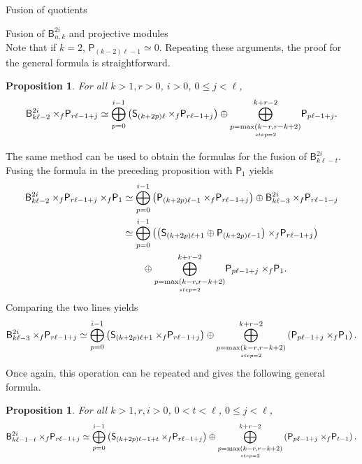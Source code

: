 \documentclass[reqno]{amsart}
\newtheorem{Prop}[Thm]{Proposition}
\newcommand{\ds}[1]{\mathsf S_{#1}}
\newcommand{\dP}[1]{\mathsf P_{#1}}
\newcommand{\xf}{\times\hspace{-0.27em}_f}
\newcommand{\B}[2]{\mathsf{B}^{#1}_{#2}}
\newcommand{\lc}{\ell}
\begin{document}
\begin{section}{Fusion of quotients}
\begin{subsection}{Fusion of $\B{2i}{n,k}$ and projective modules}
\begin{equation*}
\end{equation*}
Note that if $k=2$, $\dP{(k-2)\lc-1}\simeq 0$. Repeating these arguments, the proof for the general formula is straightforward.
\begin{Prop}\label{prop:fusionBvsP}
For all $k>1,r>0$, $i>0$, $0\leq j<\lc$,
\begin{equation}
	\B{2i}{k\lc-2} \xf \dP{r\lc -1 +j} \simeq \overset{i-1}{\underset{p = 0}{\bigoplus}}\left(\ds{(k+2p)\lc} \xf \dP{r\lc-1+j}\right) \oplus \overset{k+r-2}{\underset{\underset{step=2}{p = \max\left( k-r,r-k+2\right)}}{\bigoplus}} \dP{p\lc-1+j}.
\end{equation}
\end{Prop}
The same method can be used to obtain the formulas for the fusion of $\B{2i}{k\lc-t}$. Fusing the formula in the preceding proposition with $\dP{1}$ yields
\begin{align}
\B{2i}{k\lc-2} \xf \dP{r\lc -1 +j} \xf \dP{1}  & \simeq \overset{i-1}{\underset{p = 0}{\bigoplus}}\left(\dP{(k+2p)\lc-1} \xf \dP{r \lc-1 +j}\right) \oplus \B{2i}{k\lc-3} \xf \dP{r \lc -1 -j} \\
& \simeq \overset{i-1}{\underset{p = 0}{\bigoplus}}\left(\left(\ds{(k+2p)\lc+1} \oplus \dP{(k+2p)\lc-1}\right) \xf \dP{r\lc-1+j}\right)\\
& \qquad \oplus \overset{k+r-2}{\underset{\underset{step=2}{p = \max\left( k-r,r-k+2\right)}}{\bigoplus}} \dP{p\lc-1+j}\xf \dP{1}.
\end{align}
Comparing the two lines yields
\begin{equation}
	\B{2i}{k\lc-3} \xf \dP{r\lc -1 +j} \simeq \overset{i-1}{\underset{p = 0}{\bigoplus}}\left(\ds{(k+2p)\lc+1} \xf \dP{r\lc-1+j}\right) \oplus \overset{k+r-2}{\underset{\underset{step=2}{p = \max\left( k-r,r-k+2\right)}}{\bigoplus}} \left(\dP{p\lc-1+j} \xf \dP{1}\right).
\end{equation}
Once again, this operation can be repeated and gives the following general formula.
\begin{Prop}
For all $k>1,r,i>0$, $0<t<\lc$, $0\leq j <\lc$,
\begin{equation}
	\B{2i}{k\lc-1-t} \xf \dP{r\lc -1 +j} \simeq \overset{i-1}{\underset{p = 0}{\bigoplus}}\left(\ds{(k+2p)\lc-1+t} \xf \dP{r\lc-1+j}\right) \oplus \overset{k+r-2}{\underset{\underset{step=2}{p = \max\left( k-r,r-k+2\right)}}{\bigoplus}}\left( \dP{p\lc-1+j}\xf \dP{t-1}\right).
\end{equation} 
\end{Prop}


\end{subsection}
\end{section}
\end{document}
